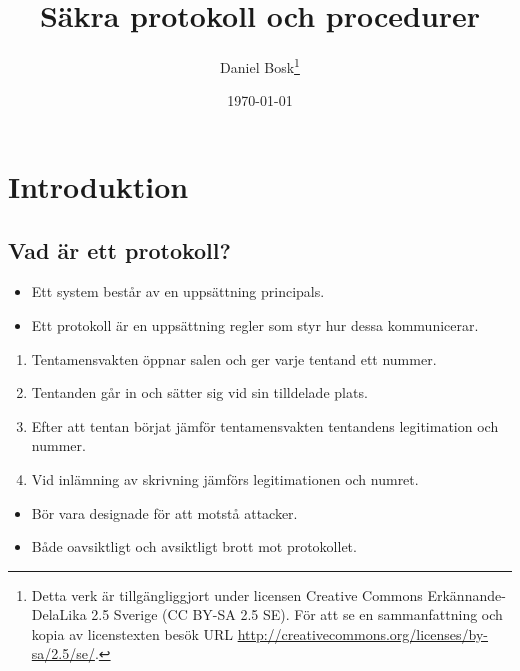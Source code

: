 \documentclass{beamer}
\title[Säkra protokoll]{%
  Säkra protokoll och procedurer
}
\author[D.~Bosk]{Daniel Bosk\footnote{%
  Detta verk är tillgängliggjort under licensen Creative Commons 
  Erkännande-DelaLika 2.5 Sverige (CC BY-SA 2.5 SE).
	För att se en sammanfattning och kopia av licenstexten besök URL 
	\url{http://creativecommons.org/licenses/by-sa/2.5/se/}.
}}
\institute[MIUN IKS]{%
  Avdelningen för informations- och kommunikationssytem (IKS),\\
  Mittuniversitetet, Sundsvall.
}
\date{\today}
\theoremstyle{definition}
\theoremstyle{remark}
\begin{document}
\begin{frame}
  \titlepage{}
\end{frame}





\section{Introduktion}

\subsection{Vad är ett protokoll?}

\begin{frame}
  \begin{itemize}
    \item Ett system består av en uppsättning principals.
    \item Ett protokoll är en uppsättning regler som styr hur dessa 
      kommunicerar.
  \end{itemize}
  \begin{example}
    \begin{enumerate}
      \item Tentamensvakten öppnar salen och ger varje tentand ett nummer.
      \item Tentanden går in och sätter sig vid sin tilldelade plats.
      \item Efter att tentan börjat jämför tentamensvakten tentandens 
        legitimation och nummer.
      \item Vid inlämning av skrivning jämförs legitimationen och numret.
    \end{enumerate}
  \end{example}
\end{frame}

\begin{frame}
  \begin{itemize}
    \item Bör vara designade för att motstå attacker.
    \item Både oavsiktligt och avsiktligt brott mot protokollet.
  \end{itemize}
\end{frame}
\end{document}
